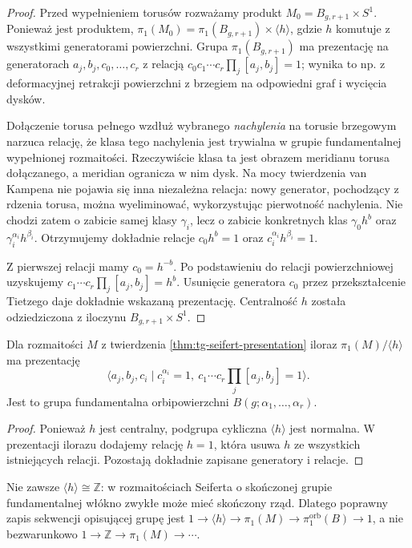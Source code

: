 \begin{proof}
Przed wypełnieniem torusów rozważamy produkt
$M_0=B_{g,r+1}\times S^1$. Ponieważ jest produktem,
$\pi_1(M_0)=\pi_1(B_{g,r+1})\times\langle h\rangle$,
gdzie $h$ komutuje z wszystkimi generatorami
powierzchni. Grupa $\pi_1(B_{g,r+1})$ ma
prezentację na generatorach $a_j,b_j,c_0,\ldots,c_r$
z relacją $c_0c_1\cdots c_r\prod_j[a_j,b_j]=1$;
wynika to np. z deformacyjnej retrakcji powierzchni
z brzegiem na odpowiedni graf i wycięcia dysków.

Dołączenie torusa pełnego wzdłuż wybranego
\emph{nachylenia} na torusie brzegowym narzuca relację,
że klasa tego nachylenia jest trywialna w grupie
fundamentalnej wypełnionej rozmaitości. Rzeczywiście
klasa ta jest obrazem meridianu torusa dołączanego,
a meridian ogranicza w nim dysk. Na mocy twierdzenia
van Kampena nie pojawia się inna niezależna relacja:
nowy generator, pochodzący z rdzenia torusa, można
wyeliminować, wykorzystując pierwotność nachylenia.
Nie chodzi zatem o zabicie samej klasy $\gamma_i$,
lecz o zabicie konkretnych klas
$\gamma_0h^b$ oraz $\gamma_i^{\alpha_i}h^{\beta_i}$.
Otrzymujemy dokładnie relacje $c_0h^b=1$ oraz
$c_i^{\alpha_i}h^{\beta_i}=1$.

Z pierwszej relacji mamy $c_0=h^{-b}$. Po podstawieniu
do relacji powierzchniowej uzyskujemy
$c_1\cdots c_r\prod_j[a_j,b_j]=h^b$.
Usunięcie generatora $c_0$ przez przekształcenie
Tietzego daje dokładnie wskazaną prezentację.
Centralność $h$ została odziedziczona z iloczynu
$B_{g,r+1}\times S^1$.
\end{proof}

\begin{wniosek}
Dla rozmaitości $M$ z twierdzenia
\ref{thm:tg-seifert-presentation} iloraz
$\pi_1(M)/\langle h\rangle$ ma prezentację
\[
\big\langle a_j,b_j,c_i\mid c_i^{\alpha_i}=1,
\ c_1\cdots c_r\prod_j[a_j,b_j]=1\big\rangle.
\]
Jest to grupa fundamentalna orbipowierzchni
$B(g;\alpha_1,\ldots,\alpha_r)$.
\end{wniosek}
\begin{proof}
Ponieważ $h$ jest centralny, podgrupa cykliczna
$\langle h\rangle$ jest normalna. W prezentacji
ilorazu dodajemy relację $h=1$, która usuwa $h$
ze wszystkich istniejących relacji. Pozostają dokładnie
zapisane generatory i relacje.
\end{proof}

\begin{uwaga}
Nie zawsze $\langle h\rangle\cong\mathbb Z$:
w rozmaitościach Seiferta o skończonej grupie fundamentalnej
włókno zwykłe może mieć skończony rząd. Dlatego poprawny
zapis sekwencji opisującej grupę jest
$1\to\langle h\rangle\to\pi_1(M)\to
\pi_1^{\mathrm{orb}}(B)\to1$,
a nie bezwarunkowo $1\to\mathbb Z\to\pi_1(M)\to\cdots$.
\end{uwaga}


